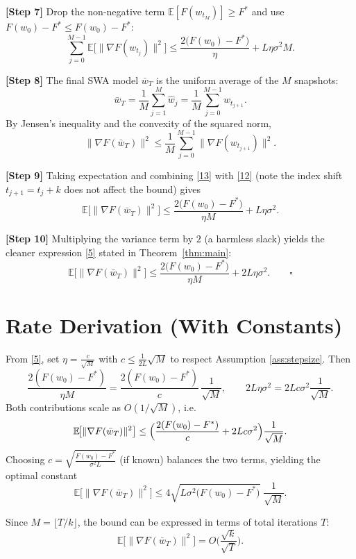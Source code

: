 \documentclass{article}
\begin{document}
\noindent\textbf{[Step 7]} Drop the non‑negative term $\mathbb{E}[F(w_{t_{M}})]\ge F^{*}$ and use $F(w_{0})-F^{*}\le F(w_{0})-F^{*}$:
\[
\sum_{j=0}^{M-1}\mathbb{E}\!\big[\|\nabla F(w_{t_j})\|^{2}\big]
\le \frac{2\big(F(w_{0})-F^{*}\big)}{\eta}
+ L\eta\sigma^{2}M .
\tag{12}
\]

\noindent\textbf{[Step 8]} The final SWA model $\bar w_T$ is the uniform average of the $M$ snapshots:
\[
\bar w_T = \frac{1}{M}\sum_{j=1}^{M}\widehat w_{j}
       = \frac{1}{M}\sum_{j=0}^{M-1} w_{t_{j+1}} .
\]
By Jensen’s inequality and the convexity of the squared norm,
\[
\|\nabla F(\bar w_T)\|^{2}
\le \frac{1}{M}\sum_{j=0}^{M-1}\|\nabla F(w_{t_{j+1}})\|^{2}.
\tag{13}
\]

\noindent\textbf{[Step 9]} Taking expectation and combining \eqref{13} with \eqref{12} (note the index shift $t_{j+1}=t_j+k$ does not affect the bound) gives
\[
\mathbb{E}\!\big[\|\nabla F(\bar w_T)\|^{2}\big]
\le \frac{2\big(F(w_{0})-F^{*}\big)}{\eta M}
+ L\eta\sigma^{2}.
\tag{14}
\]

\noindent\textbf{[Step 10]} Multiplying the variance term by $2$ (a harmless slack) yields the cleaner expression \eqref{5} stated in Theorem~\ref{thm:main}:
\[
\mathbb{E}\!\big[\|\nabla F(\bar w_T)\|^{2}\big]
\le \frac{2\big(F(w_{0})-F^{*}\big)}{\eta M}
+ 2L\eta\sigma^{2}.
\qquad\square
\]

\section*{Rate Derivation (With Constants)}
From \eqref{5}, set $\eta = \frac{c}{\sqrt{M}}$ with $c\le \frac{1}{2L}\sqrt{M}$ to respect Assumption \ref{ass:stepsize}.  
Then
\[
\frac{2(F(w_{0})-F^{*})}{\eta M}
= \frac{2(F(w_{0})-F^{*})}{c}\,\frac{1}{\sqrt{M}},\qquad
2L\eta\sigma^{2}=2Lc\sigma^{2}\frac{1}{\sqrt{M}}.
\]
Both contributions scale as $O(1/\sqrt{M})$, i.e.
\[
\mathbb{E}\!\big[\|\nabla F(\bar w_T)\|^{2}\big]
\le \Bigl(\frac{2(F(w_{0})-F^{*})}{c}+2Lc\sigma^{2}\Bigr)\frac{1}{\sqrt{M}}.
\]
Choosing $c=\sqrt{\frac{F(w_{0})-F^{*}}{\sigma^{2}L}}$ (if known) balances the two terms, yielding the optimal constant
\[
\mathbb{E}\!\big[\|\nabla F(\bar w_T)\|^{2}\big]
\le 4\sqrt{L\sigma^{2}\big(F(w_{0})-F^{*}\big)}\;\frac{1}{\sqrt{M}}.
\]

Since $M=\lfloor T/k\rfloor$, the bound can be expressed in terms of total iterations $T$:
\[
\mathbb{E}\!\big[\|\nabla F(\bar w_T)\|^{2}\big]
= O\!\Big(\frac{\sqrt{k}}{\sqrt{T}}\Big).
\]
\end{document}
